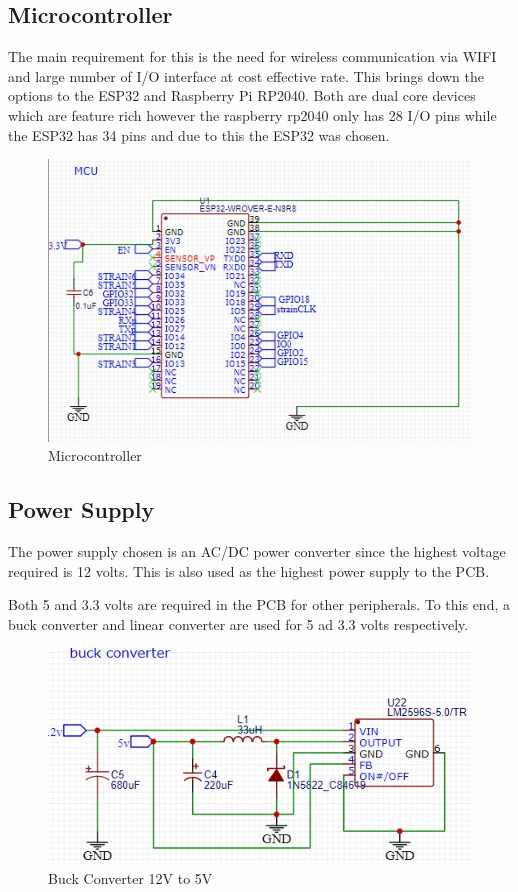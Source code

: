 \subsection{Microcontroller}
The main requirement for this is the need for wireless communication via WIFI and large number of I/O interface at cost effective rate. This brings down the options to the ESP32 and Raspberry Pi RP2040. Both are dual core devices which are feature rich however the raspberry rp2040 only has 28 I/O pins while the ESP32 has 34 pins and due to this the ESP32 was chosen. 
\begin{center}
	\begin{figure}[H]
	\centering
	\includegraphics[width=0.7\linewidth]{Figures/mcu}
	\caption[Microcontroller]{Microcontroller}
	\end{figure}
\end{center}
\subsection{Power Supply}
The power supply chosen is an AC/DC power converter since the highest voltage required is 12 volts. This is also used as the highest power supply to the PCB.

Both 5 and 3.3 volts are required in the PCB for other peripherals. To this end, a buck converter and linear converter are used for 5 ad 3.3 volts respectively.

\begin{center}
	\begin{figure}[H]
	\centering
	\includegraphics{Figures/buck}
	\caption[Buck converter]{Buck Converter 12V to 5V}
	\end{figure}
\end{center}

